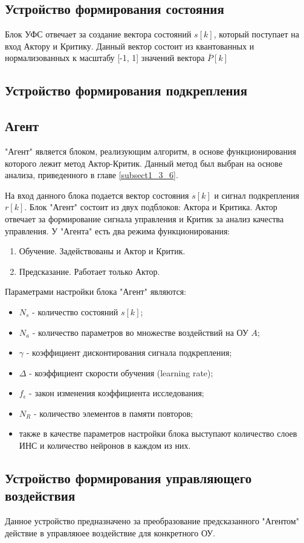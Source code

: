 \subsection{Устройство формирования состояния} \label{subsect2_2_2}
Блок УФС отвечает за создание вектора состояний $s[k]$, который поступает на вход Актору и Критику. Данный вектор состоит из квантованных и нормализованных к масштабу [-1, 1] значений вектора $\bar{P}[k]$ 

\subsection{Устройство формирования подкрепления} \label{subsect2_2_3}

\subsection{Агент} \label{subsect2_2_4}
"Агент" является блоком, реализующим алгоритм, в основе функционирования которого лежит метод Актор-Критик. Данный метод был выбран на основе анализа, приведенного в главе \ref{subsect1_3_6}.

На вход данного блока подается вектор состояния $s[k]$ и сигнал подкрепления $r[k]$. Блок "Агент" состоит из двух подблоков: Актора и Критика. Актор отвечает за формирование сигнала управления и Критик за анализ качества управления. У "Агента" есть два режима функционирования:
\begin{enumerate}
	\item Обучение. Задействованы и Актор и Критик.
	\item Предсказание. Работает только Актор.
\end{enumerate} 

Параметрами настройки блока "Агент" являются:
\begin{itemize}
	\item $ N_s $ - количество состояний $s[k]$;
	\item $ N_a $ - количество параметров во множестве воздействий на ОУ $ A $;
	\item $ \gamma $ - коэффициент дисконтирования сигнала подкрепления;
	\item $ \Delta $ - коэффициент скорости обучения (learning rate);
	\item $ f_{\epsilon} $ - закон изменения коэффициента исследования;
	\item $ N_R $ - количество элементов в памяти повторов;
	\item также в качестве параметров настройки блока выступают количество слоев ИНС и количество нейронов в каждом из них.
\end{itemize}

\subsection{Устройство формирования управляющего воздействия} \label{subsect2_2_5}
Данное устройство предназначено за преобразование предсказанного "Агентом" действие в управляюее воздействие для конкретного ОУ.

